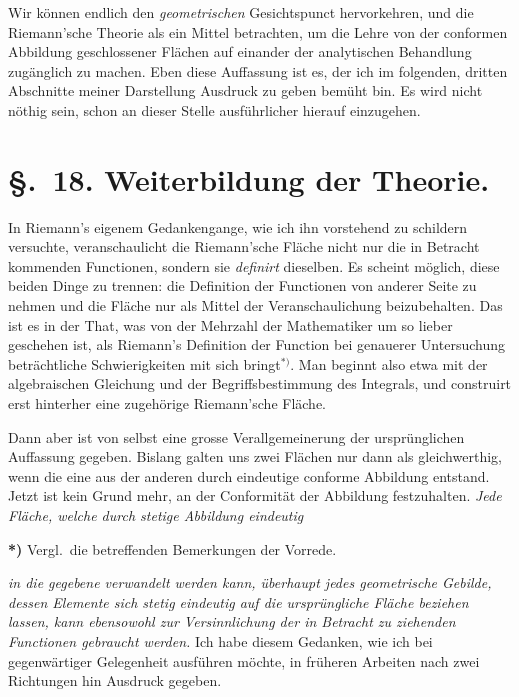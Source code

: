 \documentclass{article}
\begin{document}
Wir können endlich den \emph{geometrischen} Gesichtspunct hervorkehren, und die Riemann'sche Theorie als ein Mittel betrachten, um die Lehre von der conformen Abbildung geschlossener Flächen auf einander der analytischen Behandlung zugänglich zu machen. Eben diese Auffassung ist es, der ich im folgenden, dritten Abschnitte meiner Darstellung Ausdruck zu geben bemüht bin. Es wird nicht nöthig sein, schon an dieser Stelle ausführlicher hierauf einzugehen.

\section*{§.~18. Weiterbildung der Theorie.}

In Riemann's eigenem Gedankengange, wie ich ihn vorstehend zu schildern versuchte, veranschaulicht die Riemann'sche Fläche nicht nur die in Betracht kommenden Functionen, sondern sie \emph{definirt} dieselben. Es scheint möglich, diese beiden Dinge zu trennen: die Definition der Functionen von anderer Seite zu nehmen und die Fläche nur als Mittel der Veranschaulichung beizubehalten. Das ist es in der That, was von der Mehrzahl der Mathematiker um so lieber geschehen ist, als Riemann's Definition der Function bei genauerer Untersuchung beträchtliche Schwierigkeiten mit sich bringt${}^{*)}$. Man beginnt also etwa mit der algebraischen Gleichung und der Begriffsbestimmung des Integrals, und construirt erst hinterher eine zugehörige Riemann'sche Fläche.

Dann aber ist von selbst eine grosse Verallgemeinerung der ursprünglichen Auffassung gegeben. Bislang galten uns zwei Flächen nur dann als gleichwerthig, wenn die eine aus der anderen durch eindeutige conforme Abbildung entstand. Jetzt ist kein Grund mehr, an der Conformität der Abbildung festzuhalten. \emph{Jede Fläche, welche durch stetige Abbildung eindeutig}

\textbf{*)} Vergl.\ die betreffenden Bemerkungen der Vorrede.

\emph{in die gegebene verwandelt werden kann, überhaupt jedes geometrische Gebilde, dessen Elemente sich stetig eindeutig auf die ursprüngliche Fläche beziehen lassen, kann ebensowohl zur Versinnlichung der in Betracht zu ziehenden Functionen gebraucht werden.} Ich habe diesem Gedanken, wie ich bei gegenwärtiger Gelegenheit ausführen möchte, in früheren Arbeiten nach zwei Richtungen hin Ausdruck gegeben.
\end{document}
